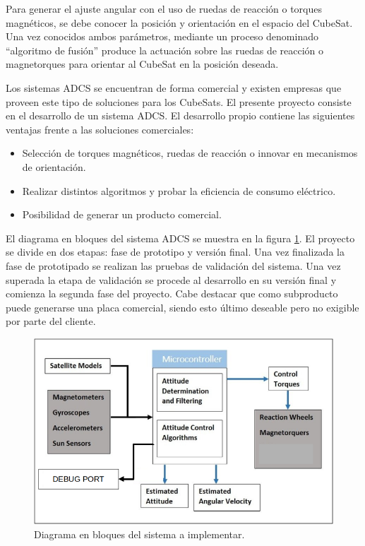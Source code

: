\documentclass[
11pt, %
]{charter}
\begin{document}
Para generar el ajuste angular con el uso de ruedas de reacción o torques magnéticos, se debe  conocer la posición y orientación en el espacio del CubeSat. Una vez conocidos ambos parámetros, mediante un proceso denominado “algoritmo de fusión” produce la actuación sobre las ruedas de reacción o magnetorques para orientar al CubeSat en la posición deseada.

 Los sistemas ADCS se encuentran de forma comercial y  existen empresas que proveen este tipo de soluciones para los CubeSats. El presente proyecto consiste en el desarrollo de un sistema ADCS. El desarrollo propio contiene las siguientes ventajas frente a las soluciones comerciales: 
\begin{itemize}
	\item Selección de torques magnéticos, ruedas de reacción o innovar en mecanismos de orientación. 
	\item Realizar distintos algoritmos y probar la eficiencia de consumo eléctrico. 
	\item Posibilidad de generar un producto comercial. 
\end{itemize}


El diagrama en bloques del sistema ADCS se muestra en la figura \ref{fig:adcs}. El proyecto se divide en dos etapas: fase de prototipo y versión final. Una vez finalizada la fase de prototipado se realizan las pruebas de validación del sistema.  Una vez superada la etapa de validación se procede al desarrollo en su versión final y comienza la segunda fase del proyecto. 
Cabe destacar que como subproducto puede generarse una placa comercial, siendo esto último deseable pero no exigible por parte del cliente. 

\begin{figure}[htpb]
	\centering 
	\includegraphics[width=.8\textwidth]{Figuras/sistemaadcs.png}
	\caption{Diagrama en bloques del sistema a implementar.}
	\label{fig:adcs}
\end{figure}
\end{document}
